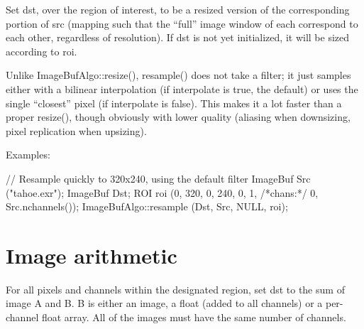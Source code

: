  
Set {\cf dst}, over the region of interest, to be a resized version of the
corresponding portion of {\cf src} (mapping such that the ``full'' image
window of each correspond to each other, regardless of resolution).  If
{\cf dst} is not yet initialized, it will be sized according to {\cf roi}.

Unlike {\cf ImageBufAlgo::resize()}, {\cf resample()} does not take a filter; it
just samples either with a bilinear interpolation (if {\cf interpolate} is
{\cf true}, the default) or uses the single ``closest'' pixel (if
{\cf interpolate} is {\cf false}).  This makes it a lot faster than a proper
{\cf resize()}, though obviously with lower quality (aliasing when
downsizing, pixel replication when upsizing).

\smallskip
\noindent Examples:
\begin{code}
    // Resample quickly to 320x240, using the default filter
    ImageBuf Src ("tahoe.exr");
    ImageBuf Dst;
    ROI roi (0, 320, 0, 240, 0, 1, /*chans:*/ 0, Src.nchannels());
    ImageBufAlgo::resample (Dst, Src, NULL, roi);
\end{code}
\apiend



\section{Image arithmetic}
\label{sec:iba:arith}

 

For all pixels and channels within the designated region, set
{\cf dst} to the sum of image {\cf A} and {\cf B}.  {\cf B} is either an image,
a float (added to all channels) or a per-channel float array.
All of the images must have the same number of channels.

